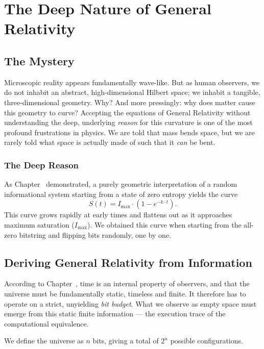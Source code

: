 \chapter{The Deep Nature of General Relativity}
\label{chap:the-nature-of-geometry}

\section{The Mystery}

Microscopic reality appears fundamentally wave-like. 
But as human observers, we do not inhabit an abstract, high-dimensional Hilbert space; 
we inhabit a tangible, three-dimensional geometry. 
Why? And more pressingly: why does matter cause this geometry to curve? 
Accepting the equations of General Relativity without understanding the deep, 
underlying \textit{reason} for this curvature is one of the most profound frustrations in physics. 
We are told that mass bends space, but we are rarely told what space is actually made of such that it \textit{can} be bent.

\subsection*{The Deep Reason}

As Chapter~ demonstrated, a purely geometric interpretation of a 
random informational system starting from a state of zero entropy yields the curve
\[
S(t) = I_{\text{max}} \cdot (1 - e^{-k \cdot t}).
\]
This curve grows rapidly at early times and flattens out as it approaches maximum saturation ($I_{\text{max}}$). 
We obtained this curve when starting from the all-zero bitstring and flipping bits randomly, one by one.


\section*{Deriving General Relativity from Information}

According to Chapter~, time is an internal property of observers, and 
that the universe must be fundamentally static, timeless and finite. It therefore has to operate
on a strict, unyielding \textit{bit budget}. 
What we observe as empty space must emerge from this static finite information --- the execution trace of the computational equivalence.

We define the universe as $n$ bits, giving a total of $2^n$ possible configurations. 

